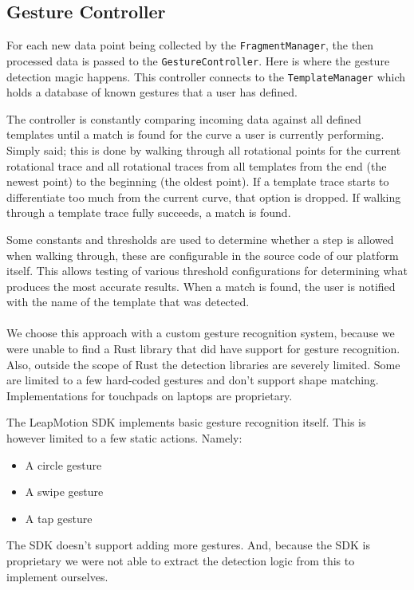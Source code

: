 \documentclass{standalone}
\begin{document}
  \subsection{Gesture Controller}
  For each new data point being collected by the \verb_FragmentManager_, the
  then processed data is passed to the \verb_GestureController_. Here is where
  the gesture detection magic happens. This controller connects to the
  \verb_TemplateManager_ which holds a database of known gestures that a user
  has defined.

  The controller is constantly comparing incoming data against all
  defined templates until a match is found for the curve a user is currently
  performing. Simply said; this is done by walking through all rotational points
  for the current rotational trace and all rotational traces from all templates
  from the end (the newest point) to the beginning (the oldest point). If a
  template trace starts to differentiate too much from the current curve, that
  option is dropped. If walking through a template trace fully succeeds, a
  match is found.

  Some constants and thresholds are used to determine whether a
  step is allowed when walking through, these are configurable in the source
  code of our platform itself. This allows testing of various threshold
  configurations for determining what produces the most accurate results.
  When a match is found, the user is notified with the name of the template that
  was detected.

  \paragraph{}
  We choose this approach with a custom gesture recognition system, because we
  were unable to find a Rust library that did have support for gesture
  recognition. Also, outside the scope of Rust the detection libraries are
  severely limited. Some are limited to a few hard-coded gestures and don't
  support shape matching. Implementations for touchpads on laptops are
  proprietary.

  The LeapMotion SDK implements basic gesture recognition itself. This is
  however limited to a few static actions. Namely:
  \begin{itemize}
    \tightlist{}
    \item A circle gesture
    \item A swipe gesture
    \item A tap gesture
  \end{itemize}
  The SDK doesn't support adding more gestures. And, because the SDK is
  proprietary we were not able to extract the detection logic from this to
  implement ourselves.
\end{document}
